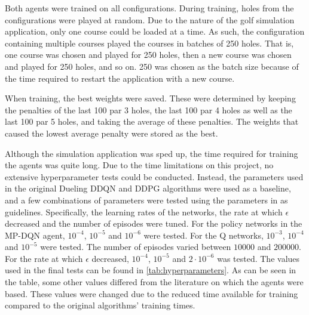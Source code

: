 \documentclass{kththesis}
\begin{document}
Both agents were trained on all configurations. During training, holes from the configurations were played at random. Due to the nature of the golf simulation application, only one course could be loaded at a time. As such, the configuration containing multiple courses played the courses in batches of 250 holes. That is, one course was chosen and played for 250 holes, then a new course was chosen and played for 250 holes, and so on. 250 was chosen as the batch size because of the time required to restart the application with a new course.

When training, the best weights were saved. These were determined by keeping the penalties of the last 100 par 3 holes, the last 100 par 4 holes as well as the last 100 par 5 holes, and taking the average of these penalties. The weights that caused the lowest average penalty were stored as the best.

Although the simulation application was sped up, the time required for training the agents was quite long. Due to the time limitations on this project, no extensive hyperparameter tests could be conducted. Instead, the parameters used in the original Dueling DDQN and DDPG algorithms were used as a baseline, and a few combinations of parameters were tested using the parameters in \textcite{bester2019mpdqn} as guidelines. Specifically, the learning rates of the networks, the rate at which $\epsilon$ decreased and the number of episodes were tuned. For the policy networks in the MP-DQN agent, $10^{-4}$, $10^{-5}$ and $10^{-6}$ were tested. For the Q networks, $10^{-3}$, $10^{-4}$ and $10^{-5}$ were tested. The number of episodes varied between $10000$ and $200000$. For the rate at which $\epsilon$ decreased, $10^{-4}$, $10^{-5}$ and $2 \cdot 10^{-6}$ was tested. The values used in the final tests can be found in \autoref{tab:hyperparameters}. As can be seen in the table, some other values differed from the literature on which the agents were based. These values were changed due to the reduced time available for training compared to the original algorithms' training times.
\end{document}
